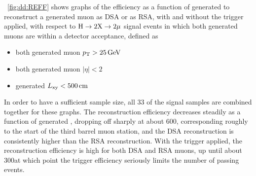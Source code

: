 \Fig~\ref{fig:dd:REFF} shows graphs of the efficiency as a function of generated \Lxy to reconstruct a generated muon as DSA or as RSA, with and without the trigger applied, with respect to \mbox{$\mathrm{H}\to2\mathrm{X}\to2\mathrm{\mu}$} signal events in which both generated muons are within a detector acceptance, defined as
\begin{itemize}
  \item both generated muon $p_{\mathrm{T}} > 25\,\text{Ge\hspace{-.08em}V}$
  \item both generated muon $|\eta| < 2$
  \item generated \mbox{$L_{\mathrm{xy}} < 500\,\text{cm}$}
\end{itemize}
In order to have a sufficient sample size, all 33 of the \twoMu signal samples are combined together for these graphs.
The reconstruction efficiency decreases steadily as a function of generated \Lxy, dropping off sharply at about 600\cm, corresponding roughly to the start of the third barrel muon station, and the DSA reconstruction is consistently higher than the RSA reconstruction.
With the trigger applied, the reconstruction efficiency is high for both DSA and RSA muons, up until about 300\cm at which point the trigger efficiency seriously limits the number of passing events.

